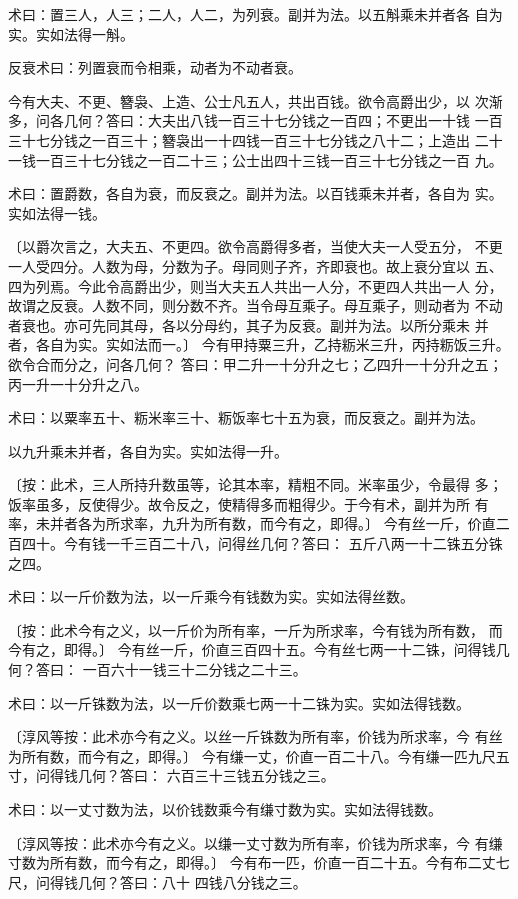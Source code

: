 \documentclass[a4paper,12pt,UTF8,twoside]{ctexbook}
\begin{document}
术曰：置三人，人三；二人，人二，为列衰。副并为法。以五斛乘未并者各 自为实。实如法得一斛。

反衰术曰：列置衰而令相乘，动者为不动者衰。

今有大夫、不更、簪袅、上造、公士凡五人，共出百钱。欲令高爵出少，以 次渐多，问各几何？答曰：大夫出八钱一百三十七分钱之一百四；不更出一十钱 一百三十七分钱之一百三十；簪袅出一十四钱一百三十七分钱之八十二；上造出 二十一钱一百三十七分钱之一百二十三；公士出四十三钱一百三十七分钱之一百 九。

术曰：置爵数，各自为衰，而反衰之。副并为法。以百钱乘未并者，各自为 实。实如法得一钱。

〔以爵次言之，大夫五、不更四。欲令高爵得多者，当使大夫一人受五分， 不更一人受四分。人数为母，分数为子。母同则子齐，齐即衰也。故上衰分宜以 五、四为列焉。今此令高爵出少，则当大夫五人共出一人分，不更四人共出一人 分，故谓之反衰。人数不同，则分数不齐。当令母互乘子。母互乘子，则动者为 不动者衰也。亦可先同其母，各以分母约，其子为反衰。副并为法。以所分乘未 并者，各自为实。实如法而一。〕 今有甲持粟三升，乙持粝米三升，丙持粝饭三升。欲令合而分之，问各几何？ 答曰：甲二升一十分升之七；乙四升一十分升之五；丙一升一十分升之八。

术曰：以粟率五十、粝米率三十、粝饭率七十五为衰，而反衰之。副并为法。

以九升乘未并者，各自为实。实如法得一升。

〔按：此术，三人所持升数虽等，论其本率，精粗不同。米率虽少，令最得 多；饭率虽多，反使得少。故令反之，使精得多而粗得少。于今有术，副并为所 有率，未并者各为所求率，九升为所有数，而今有之，即得。〕 今有丝一斤，价直二百四十。今有钱一千三百二十八，问得丝几何？答曰： 五斤八两一十二铢五分铢之四。

术曰：以一斤价数为法，以一斤乘今有钱数为实。实如法得丝数。

〔按：此术今有之义，以一斤价为所有率，一斤为所求率，今有钱为所有数， 而今有之，即得。〕 今有丝一斤，价直三百四十五。今有丝七两一十二铢，问得钱几何？答曰： 一百六十一钱三十二分钱之二十三。

术曰：以一斤铢数为法，以一斤价数乘七两一十二铢为实。实如法得钱数。

〔淳风等按：此术亦今有之义。以丝一斤铢数为所有率，价钱为所求率，今 有丝为所有数，而今有之，即得。〕 今有缣一丈，价直一百二十八。今有缣一匹九尺五寸，问得钱几何？答曰： 六百三十三钱五分钱之三。

术曰：以一丈寸数为法，以价钱数乘今有缣寸数为实。实如法得钱数。

〔淳风等按：此术亦今有之义。以缣一丈寸数为所有率，价钱为所求率，今 有缣寸数为所有数，而今有之，即得。〕 今有布一匹，价直一百二十五。今有布二丈七尺，问得钱几何？答曰：八十 四钱八分钱之三。
\end{document}
